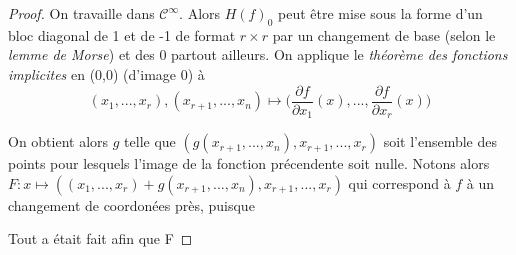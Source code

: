 \documentclass[a4paper]{article}
\begin{document}
\begin{proof}
On travaille dans $\mathcal{C}^\infty$. Alors $H(f)_0$ peut être mise sous la forme d'un bloc diagonal de 1 et de -1 de format $r\times r$ par un changement de base (selon le \textit{lemme de Morse}) et des 0 partout ailleurs. On applique le \textit{théorème des fonctions implicites} en (0,0) (d'image 0) à $$(x_1,...,x_r),(x_{r+1},...,x_n)\mapsto \big(\frac{\partial f}{\partial x_1}(x), ..., \frac{\partial f}{\partial x_r}(x)\big)$$

On obtient alors $g$ telle que $(g(x_{r+1},...,x_n),x_{r+1},...,x_{r})$ soit l'ensemble des points pour lesquels l'image de la fonction précendente soit nulle. Notons alors $F: x\mapsto ((x_1,...,x_r)+g(x_{r+1},...,x_n),x_{r+1},...,x_{r})$ qui correspond à $f$ à un changement de coordonées près, puisque

Tout a était fait afin que F
\end{proof}
\end{document}
